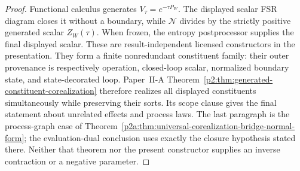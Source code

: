 \documentclass[12pt,a4paper]{article}
\begin{document}
\begin{proof}
Functional calculus generates \(V_\tau=e^{-\tau P_W}\).  The displayed
scalar FSR diagram closes it without a boundary, while \(\mathcal N\) divides
by the strictly positive generated scalar \(Z_W(\tau)\).  When frozen, the
entropy postprocessor supplies the final displayed scalar.  These are
result-independent licensed constructors in the presentation.  They form a
finite nonredundant constituent family: their
outer provenance is respectively operation, closed-loop scalar, normalized
boundary state, and state-decorated loop.  Paper~II-A
Theorem~\ref{p2:thm:generated-constituent-corealization} therefore realizes
all displayed constituents simultaneously while preserving their sorts.  Its
scope clause gives the final statement about unrelated effects and process
laws.  The last paragraph is the process-graph case of
Theorem~\ref{p2a:thm:universal-corealization-bridge-normal-form}; the
evaluation-dual conclusion uses exactly the closure hypothesis stated there.
Neither that theorem nor the present constructor supplies an inverse
contraction or a negative parameter.
\end{proof}
\end{document}
